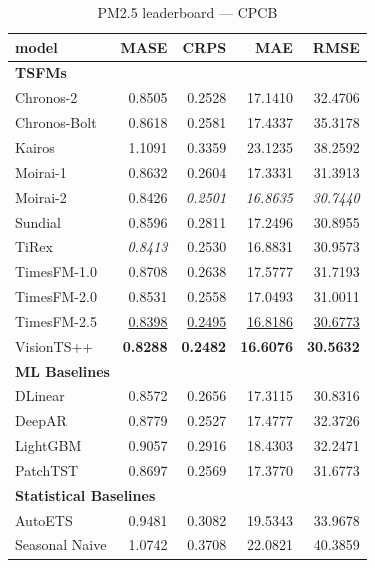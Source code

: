 \begin{table}[H]
\caption{PM2.5 leaderboard --- CPCB}
\centering
\begin{small}
\begin{tabular}{lrrrr}
\toprule
model & MASE & CRPS & MAE & RMSE \\
\midrule
\multicolumn{5}{l}{\textbf{TSFMs}} \\
Chronos-2 & 0.8505 & 0.2528 & 17.1410 & 32.4706 \\
Chronos-Bolt & 0.8618 & 0.2581 & 17.4337 & 35.3178 \\
Kairos & 1.1091 & 0.3359 & 23.1235 & 38.2592 \\
Moirai-1 & 0.8632 & 0.2604 & 17.3331 & 31.3913 \\
Moirai-2 & 0.8426 & \textit{0.2501} & \textit{16.8635} & \textit{30.7440} \\
Sundial & 0.8596 & 0.2811 & 17.2496 & 30.8955 \\
TiRex & \textit{0.8413} & 0.2530 & 16.8831 & 30.9573 \\
TimesFM-1.0 & 0.8708 & 0.2638 & 17.5777 & 31.7193 \\
TimesFM-2.0 & 0.8531 & 0.2558 & 17.0493 & 31.0011 \\
TimesFM-2.5 & \underline{0.8398} & \underline{0.2495} & \underline{16.8186} & \underline{30.6773} \\
VisionTS++ & \textbf{0.8288} & \textbf{0.2482} & \textbf{16.6076} & \textbf{30.5632} \\
\midrule
\multicolumn{5}{l}{\textbf{ML Baselines}} \\
DLinear & 0.8572 & 0.2656 & 17.3115 & 30.8316 \\
DeepAR & 0.8779 & 0.2527 & 17.4777 & 32.3726 \\
LightGBM & 0.9057 & 0.2916 & 18.4303 & 32.2471 \\
PatchTST & 0.8697 & 0.2569 & 17.3770 & 31.6773 \\
\midrule
\multicolumn{5}{l}{\textbf{Statistical Baselines}} \\
AutoETS & 0.9481 & 0.3082 & 19.5343 & 33.9678 \\
Seasonal Naive & 1.0742 & 0.3708 & 22.0821 & 40.3859 \\
\bottomrule
\end{tabular}
\end{small}
\end{table}